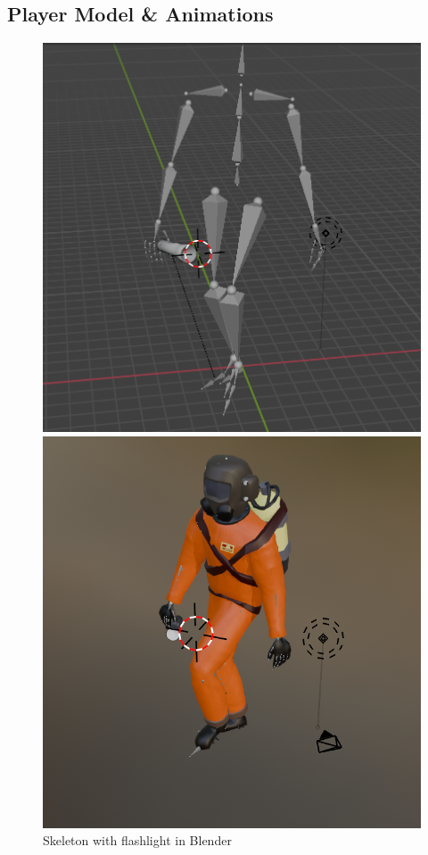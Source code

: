\documentclass[11pt]{article}
\begin{document}
\subsection{Player Model \& Animations}
\begin{figure}[h] %
    \centering
    \begin{minipage}{0.3\textwidth}
        \centering
        \includegraphics[width=\textwidth]{skeleton}
        \caption{Skeleton with flashlight in Blender}
    \end{minipage}
    \hfill
    \begin{minipage}{0.3\textwidth}
        \centering
        \includegraphics[width=\textwidth]{playerBlender}

\end{minipage}
\end{figure}
\end{document}
